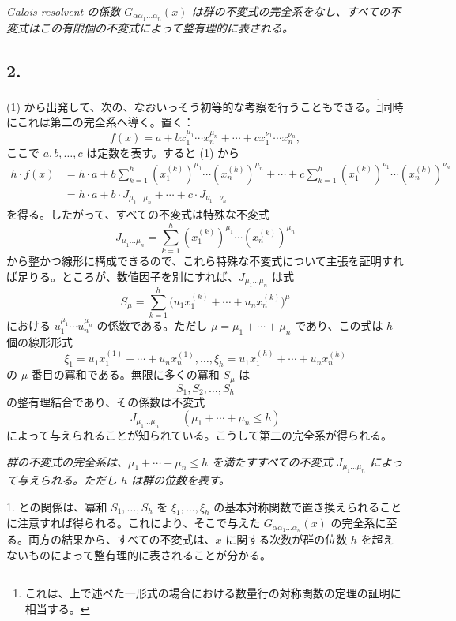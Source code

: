 \emph{Galois resolvent の係数 $G_{\alpha\alpha_1\ldots\alpha_n}(x)$ は群の不変式の完全系をなし、すべての不変式はこの有限個の不変式によって整有理的に表される。}

\subsection*{2.}
(1) から出発して、次の、なおいっそう初等的な考察を行うこともできる。\footnote{これは、上で述べた一形式の場合における数量行の対称関数の定理の証明に相当する。}同時にこれは第二の完全系へ導く。置く：
\[
  f(x)=a+b x_1^{\mu_1}\cdots x_n^{\mu_n}
       +\cdots+c x_1^{\nu_1}\cdots x_n^{\nu_n},
\]
ここで $a,b,\ldots,c$ は定数を表す。すると (1) から
\[
\begin{aligned}
 h\cdot f(x)
 &=h\cdot a+b\sum_{k=1}^{h}(x_1^{(k)})^{\mu_1}\cdots(x_n^{(k)})^{\mu_n}
     +\cdots
     +c\sum_{k=1}^{h}(x_1^{(k)})^{\nu_1}\cdots(x_n^{(k)})^{\nu_n} \\
 &=h\cdot a+b\cdot J_{\mu_1\ldots\mu_n}+\cdots+c\cdot J_{\nu_1\ldots\nu_n}
\end{aligned}
\]
を得る。したがって、すべての不変式は特殊な不変式
\[
  J_{\mu_1\ldots\mu_n}
  =\sum_{k=1}^{h}(x_1^{(k)})^{\mu_1}\cdots(x_n^{(k)})^{\mu_n}
\]
から整かつ線形に構成できるので、これら特殊な不変式について主張を証明すれば足りる。ところが、数値因子を別にすれば、$J_{\mu_1\ldots\mu_n}$ は式
\[
  S_\mu=\sum_{k=1}^{h}
  \bigl(u_1x_1^{(k)}+\cdots+u_nx_n^{(k)}\bigr)^{\mu}
\]
における $u_1^{\mu_1}
\cdots u_n^{\mu_n}$ の係数である。ただし $\mu=\mu_1+\cdots+\mu_n$ であり、この式は $h$ 個の線形形式
\[
  \xi_1=u_1x_1^{(1)}+\cdots+u_nx_n^{(1)},\ldots,
  \xi_h=u_1x_1^{(h)}+\cdots+u_nx_n^{(h)}
\]
の $\mu$ 番目の冪和である。無限に多くの冪和 $S_\mu$ は
\[
  S_1,S_2,\ldots,S_h
\]
の整有理結合であり、その係数は不変式
\[
  J_{\mu_1\ldots\mu_n}\qquad(\mu_1+\cdots+\mu_n\le h)
\]
によって与えられることが知られている。こうして第二の完全系が得られる。

\emph{群の不変式の完全系は、$\mu_1+\cdots+\mu_n\le h$ を満たすすべての不変式 $J_{\mu_1\ldots\mu_n}$ によって与えられる。ただし $h$ は群の位数を表す。}

1. との関係は、冪和 $S_1,
\ldots,S_h$ を $\xi_1,
\ldots,
\xi_h$ の基本対称関数で置き換えられることに注意すれば得られる。これにより、そこで与えた $G_{\alpha\alpha_1\ldots\alpha_n}(x)$ の完全系に至る。両方の結果から、すべての不変式は、$x$ に関する次数が群の位数 $h$ を超えないものによって整有理的に表されることが分かる。

